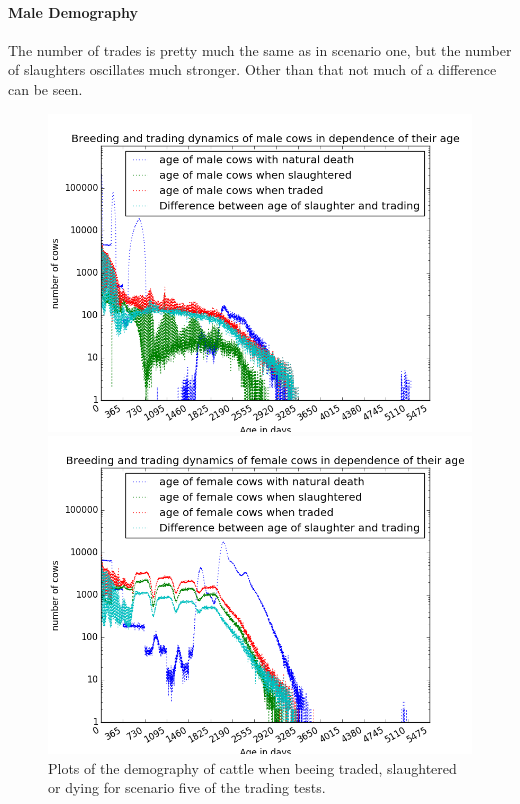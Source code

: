 \paragraph{Male Demography}
The number of trades is pretty much the same as in scenario one, but the number of slaughters oscillates much stronger. Other than that not much of a difference can be seen.
\begin{figure}[htbp]
\begin{minipage}{0.5\textwidth}
\centering
\noindent\includegraphics[width=0.9\linewidth,height=\textheight,
keepaspectratio]{scen5maleDemography.png} 
\end{minipage}
\begin{minipage}{0.5\textwidth}
\centering
\noindent\includegraphics[width=0.9\linewidth,height=\textheight,
keepaspectratio]{scen5femaleDemography.png} 
\end{minipage}
\caption[Demography in Scenario 5]{Plots of the demography of cattle when beeing traded, slaughtered or dying for scenario five of the trading tests.}
\label{fig:demographyScen5}
\end{figure} 
